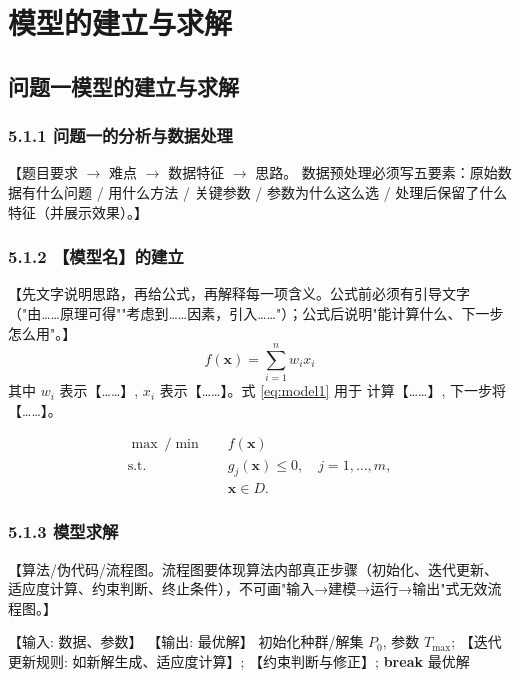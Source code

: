 \documentclass[11pt]{ctexart}
\begin{document}
\section{模型的建立与求解}

\subsection{问题一模型的建立与求解}

\subsubsection{5.1.1 问题一的分析与数据处理}
【题目要求 $\rightarrow$ 难点 $\rightarrow$ 数据特征 $\rightarrow$ 思路。
数据预处理必须写五要素：原始数据有什么问题 / 用什么方法 / 关键参数 /
参数为什么这么选 / 处理后保留了什么特征（并展示效果）。】

\subsubsection{5.1.2 【模型名】的建立}
【先文字说明思路，再给公式，再解释每一项含义。公式前必须有引导文字
（"由……原理可得""考虑到……因素，引入……"）；公式后说明"能计算什么、下一步怎么用"。】
\begin{equation}
  f(\mathbf{x}) = \sum_{i=1}^{n} w_i x_i \label{eq:model1}
\end{equation}
其中 $w_i$ 表示【……】, $x_i$ 表示【……】。式 \eqref{eq:model1} 用于
计算【……】, 下一步将【……】。

\begin{equation}
\begin{aligned}
  \max\ / \min \quad & f(\mathbf{x}) \\
  \text{s.t.} \quad & g_j(\mathbf{x}) \le 0, \quad j = 1, \dots, m, \\
  & \mathbf{x} \in D .
\end{aligned}
\label{eq:std}
\end{equation}

\subsubsection{5.1.3 模型求解}
【算法/伪代码/流程图。流程图要体现算法内部真正步骤（初始化、迭代更新、
适应度计算、约束判断、终止条件），不可画"输入→建模→运行→输出"式无效流程图。】
\begin{algorithm}[H]
  \caption{【算法名】}
  \begin{algorithmic}[1]
    \REQUIRE 【输入: 数据、参数】
    \ENSURE 【输出: 最优解】
    \STATE 初始化种群/解集 $P_0$, 参数 $T_{\max}$;
      \STATE 【迭代更新规则: 如新解生成、适应度计算】;
      \STATE 【约束判断与修正】;
        \STATE \textbf{break}
      \ENDIF
    \ENDFOR
    \RETURN 最优解
  \end{algorithmic}
\end{algorithm}
\end{document}
